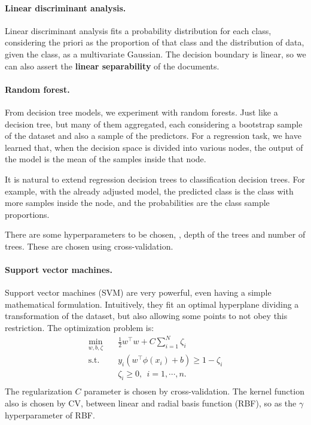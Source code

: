     \paragraph{Linear discriminant analysis.} Linear discriminant analysis fits a probability distribution for each class, considering the priori as the proportion of that class and the distribution of data, given the class, as a multivariate Gaussian. The decision boundary is linear, so we can also assert the \textbf{linear separability} of the documents.

    \paragraph{Random forest.} From decision tree models, we experiment with random forests. Just like a decision tree, but many of them aggregated, each considering a bootstrap sample of the dataset and also a sample of the predictors. For a regression task, we have learned that, when the decision space is divided into various nodes, the output of the model is the mean of the samples inside that node.

    It is natural to extend regression decision trees to classification decision trees. For example, with the already adjusted model, the predicted class is the class with more samples inside the node, and the probabilities are the class sample proportions.

    There are some hyperparameters to be chosen, \eg, depth of the trees and number of trees. These are chosen using cross-validation.

    \paragraph{Support vector machines.} Support vector machines (SVM) are very powerful, even having a simple mathematical formulation. Intuitively, they fit an optimal hyperplane dividing a transformation of the dataset, but also allowing some points to not obey this restriction. The optimization problem is:
    \[\begin{aligned}
        \min_{w, b, \zeta} \quad & \frac{1}{2}w^\intercal w + C \sum_{i = 1}^{N}{\zeta_i} \\
        \textrm{s.t.} \quad & y_i (w^\intercal \phi(x_i) + b) \ge 1 - \zeta_i \\
        & \zeta_i \ge 0, \ \ i = 1, \cdots, n. \\
    \end{aligned}\]
    The regularization $C$ parameter is chosen by cross-validation. The kernel function also is chosen by CV, between linear and radial basis function (RBF), so as the $\gamma$ hyperparameter of RBF.
